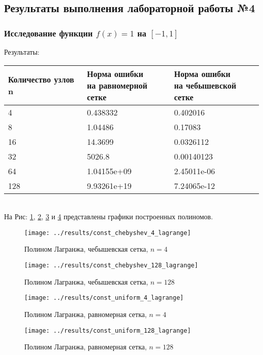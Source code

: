 \documentclass[12pt]{article}
\date{}
\author{}
\begin{document}
\subsection{Результаты выполнения лабораторной работы №4}

\subsubsection{Исследование функции $f(x) = 1$ на $[-1, 1]$}
Результаты:\\
\begin{tabular}{|l|l|l|}
\hline Количество узлов n & \pbox{20cm}{Норма ошибки\\ на равномерной сетке} & \pbox{20cm}{Норма ошибки\\ на чебышевской сетке} \\ \hline
4 & 0.438332 & 0.402016 \\ \hline
8 & 1.04486 & 0.17083 \\ \hline
16 & 14.3699 & 0.0326112 \\ \hline
32 & 5026.8 & 0.00140123 \\ \hline
64 & 1.04155e+09 & 2.45011e-06 \\ \hline
128 & 9.93261e+19 & 7.24065e-12 \\ \hline
\end{tabular}\\


На Рис: \ref{fig:constchebyshev4lagrange},  \ref{fig:constchebyshev128lagrange}, \ref{fig:constuniform4lagrange} и \ref{fig:constuniform128lagrange}
представлены графики построенных полиномов.

\begin{figure}
	\centering
	\texttt{[image: ../results/const\_chebyshev\_4\_lagrange]}
	\caption{Полином Лагранжа, чебышевская сетка, $n = 4$}
	\label{fig:constchebyshev4lagrange}
\end{figure}
\begin{figure}
	\centering
	\texttt{[image: ../results/const\_chebyshev\_128\_lagrange]}
	\caption{Полином Лагранжа, чебышевская сетка, $n = 128$}
	\label{fig:constchebyshev128lagrange}
\end{figure}
\begin{figure}
	\centering
	\texttt{[image: ../results/const\_uniform\_4\_lagrange]}
	\caption{Полином Лагранжа, равномерная сетка, $n = 4$}
	\label{fig:constuniform4lagrange}
\end{figure}
\begin{figure}
	\centering
	\texttt{[image: ../results/const\_uniform\_128\_lagrange]}
	\caption{Полином Лагранжа, равномерная сетка, $n = 128$}
	\label{fig:constuniform128lagrange}
\end{figure}
\end{document}
